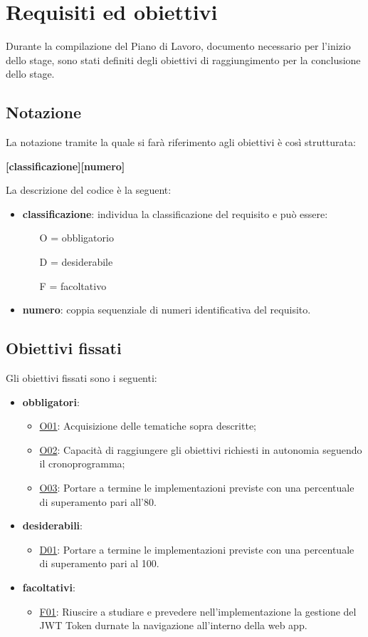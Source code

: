 \section{Requisiti ed obiettivi}
Durante la compilazione del Piano di Lavoro, documento necessario per l'inizio dello stage, sono stati definiti degli obiettivi di raggiungimento per la conclusione dello stage.

\subsection{Notazione}
La notazione tramite la quale si farà riferimento agli obiettivi è così strutturata:
\begin{center}
	\textbf{[classificazione][numero]}
\end{center}
La descrizione del codice è la seguent:
\begin{itemize}
	\item \textbf{classificazione}: individua la classificazione del requisito e può essere:
	\begin{itemize}
		\item [O =] obbligatorio
		\item [D =] desiderabile
		\item [F =] facoltativo
	\end{itemize}
\item \textbf{numero}: coppia sequenziale di numeri identificativa del requisito.
\end{itemize}
\subsection{Obiettivi fissati}
Gli obiettivi fissati sono i seguenti:
\begin{itemize}
	\item \textbf{obbligatori}:
	\begin{itemize}
		\item \underline{O01}: Acquisizione delle tematiche sopra descritte;
		\item \underline{O02}: Capacità di raggiungere gli obiettivi richiesti in autonomia seguendo il cronoprogramma;
		\item \underline{O03}: Portare a termine le implementazioni previste con una percentuale di superamento pari all'80.
	\end{itemize}
	\item \textbf{desiderabili}:
	\begin{itemize}
		\item \underline{D01}: Portare a termine le implementazioni previste con una percentuale di superamento pari al 100.
	\end{itemize}
	\item \textbf{facoltativi}:
	\begin{itemize}
		\item \underline{F01}: Riuscire a studiare e prevedere nell'implementazione la gestione del JWT Token durnate la navigazione all'interno della web app.
	\end{itemize}
\end{itemize}